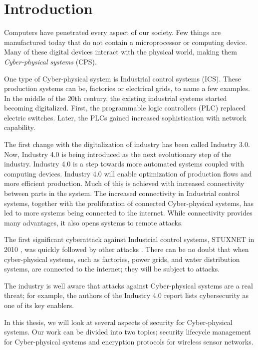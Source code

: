 \chapter{Introduction}
Computers have penetrated every aspect of our society. Few things are manufactured today that do not contain a microprocessor or computing device. Many of these digital devices interact with the physical world, making them \emph{Cyber-physical systems} (CPS).

One type of Cyber-physical system is Industrial control systems (ICS). These production systems can be, factories or electrical grids, to name a few examples. In the middle of the 20th century, the existing industrial systems started becoming digitalized. First, the programmable logic controllers (PLC) replaced electric switches. Later, the PLCs gained increased sophistication with network capability. 

The first change with the digitalization of industry has been called Industry 3.0. Now, Industry 4.0 is being introduced as the next evolutionary step of the industry. Industry 4.0 is a step towards more automated systems coupled with computing devices. Industry 4.0 will enable optimization of production flows and more efficient production. Much of this is achieved with increased connectivity between parts in the system. The increased connectivity in Industrial control systems, together with the proliferation of connected Cyber-physical systems, has led to more systems being connected to the internet. While connectivity provides many advantages, it also opens systems to remote attacks. 

The first significant cyberattack against Industrial control systems, STUXNET in 2010 \cite{falliere2011w32}, was quickly followed by other attacks \cite{case2016analysis} \cite{giles2019triton}. There can be no doubt that when cyber-physical systems, such as factories, power grids, and water distribution systems, are connected to the internet; they will be subject to attacks.

The industry is well aware that attacks against Cyber-physical systems are a real threat; for example, the authors of the Industry 4.0 report \cite{kagermann2013recommendations} lists cybersecurity as one of its key enablers.

In this thesis, we will look at several aspects of security for Cyber-physical systems. Our work can be divided into two topics; security lifecycle management for Cyber-physical systems and encryption protocols for wireless sensor networks.

